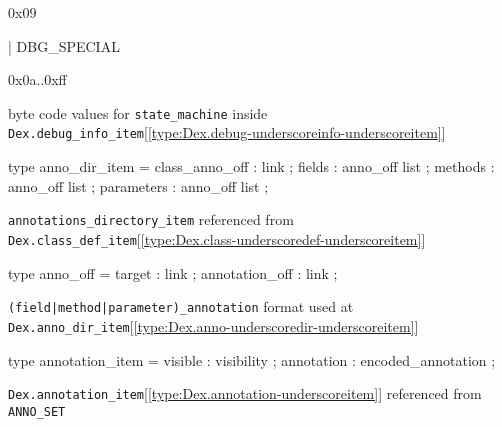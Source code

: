 \documentclass[11pt]{article}
\begin{document}
\begin{ocamldoccomment}
0x09
\end{ocamldoccomment}
\begin{ocamldoccode}
  | DBG_SPECIAL
\end{ocamldoccode}
\begin{ocamldoccomment}
0x0a..0xff
\end{ocamldoccomment}
\begin{ocamldocdescription}
byte code values for {\tt{state\_machine}} inside {\tt{Dex.debug\_info\_item}}[\ref{type:Dex.debug-underscoreinfo-underscoreitem}]


\end{ocamldocdescription}




\label{type:Dex.anno-underscoredir-underscoreitem}\begin{ocamldoccode}
type anno_dir_item = {}
  class_anno_off : link ;
  fields : anno_off list ;
  methods : anno_off list ;
  parameters : anno_off list ;
{}
\end{ocamldoccode}
\begin{ocamldocdescription}
{\tt{annotations\_directory\_item}} referenced from {\tt{Dex.class\_def\_item}}[\ref{type:Dex.class-underscoredef-underscoreitem}]


\end{ocamldocdescription}




\label{type:Dex.anno-underscoreoff}\begin{ocamldoccode}
type anno_off = {}
  target : link ;
  annotation_off : link ;
{}
\end{ocamldoccode}
\begin{ocamldocdescription}
{\tt{(field|method|parameter)\_annotation}} format used at {\tt{Dex.anno\_dir\_item}}[\ref{type:Dex.anno-underscoredir-underscoreitem}]


\end{ocamldocdescription}




\label{type:Dex.annotation-underscoreitem}\begin{ocamldoccode}
type annotation_item = {}
  visible : visibility ;
  annotation : encoded_annotation ;
{}
\end{ocamldoccode}
\begin{ocamldocdescription}
{\tt{Dex.annotation\_item}}[\ref{type:Dex.annotation-underscoreitem}] referenced from {\tt{ANNO\_SET}}


\end{ocamldocdescription}
\end{document}
